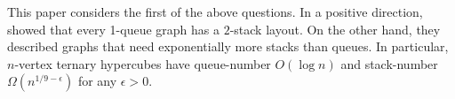 \documentclass[kpfonts]{patmorin}
\DeclareMathOperator{\sn}{sn}
\DeclareMathOperator{\qn}{qn}
\renewcommand{\leq}{\leqslant}
\begin{document}
This paper considers the first of the above questions. In a positive direction, \citet{HLR92}  showed that every 1-queue graph has a $2$-stack layout. On the other hand, they described graphs that need exponentially more stacks than queues. In particular, $n$-vertex ternary hypercubes have queue-number $O(\log n)$ and stack-number $\Omega(n^{1/9-\epsilon})$ for any $\epsilon>0$.




\end{document}
